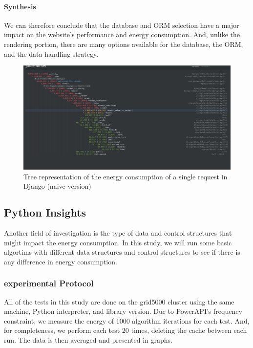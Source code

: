 \paragraph{Synthesis}

We can therefore conclude that the database and ORM selection have a major impact on the website's performance and energy consumption.
And, unlike the rendering portion, there are many options available for the database, the ORM, and the data handling strategy.

\begin{figure}[!hbt]
    \centering
    \includegraphics[width=\linewidth]{imgs/django_profiled_optimized}
    \caption{Tree representation of the energy consumption of a single request in Django (naive version)}
    \label{fig:django_profiled_optimized}
\end{figure}


\subsection{Python Insights}
Another field of investigation is the type of data and control structures that might impact the energy consumption.
In this study, we will run some basic algortims with different data structures and control structures to see if there is any difference in energy consumption.
\subsubsection{experimental Protocol}
All of the tests in this study are done on the grid5000 cluster using the same machine, Python interpreter, and library version. Due to PowerAPI's frequency constraint, we measure the energy of 1000 algorithm iterations for each test. And, for completeness, we perform each test 20 times, deleting the cache between each run. The data is then averaged and presented in graphs.

